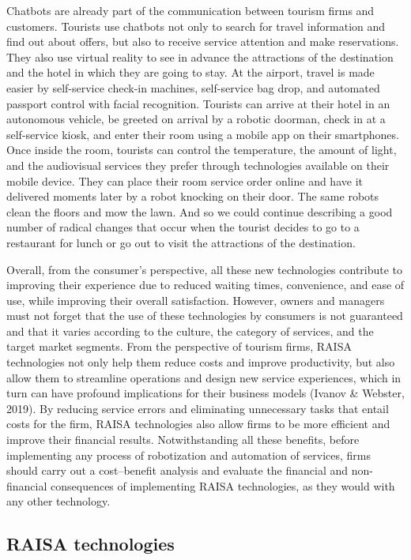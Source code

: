 \documentclass[
  letterpaper,
  DIV=11,
  numbers=noendperiod]{scrreprt}
\begin{document}
Chatbots are already part of the communication between tourism firms and
customers. Tourists use chatbots not only to search for travel
information and find out about offers, but also to receive service
attention and make reservations. They also use virtual reality to see in
advance the attractions of the destination and the hotel in which they
are going to stay. At the airport, travel is made easier by self-service
check-in machines, self-service bag drop, and automated passport control
with facial recognition. Tourists can arrive at their hotel in an
autonomous vehicle, be greeted on arrival by a robotic doorman, check in
at a self-service kiosk, and enter their room using a mobile app on
their smartphones. Once inside the room, tourists can control the
temperature, the amount of light, and the audiovisual services they
prefer through technologies available on their mobile device. They can
place their room service order online and have it delivered moments
later by a robot knocking on their door. The same robots clean the
floors and mow the lawn. And so we could continue describing a good
number of radical changes that occur when the tourist decides to go to a
restaurant for lunch or go out to visit the attractions of the
destination.

Overall, from the consumer's perspective, all these new technologies
contribute to improving their experience due to reduced waiting times,
convenience, and ease of use, while improving their overall
satisfaction. However, owners and managers must not forget that the use
of these technologies by consumers is not guaranteed and that it varies
according to the culture, the category of services, and the target
market segments. From the perspective of tourism firms, RAISA
technologies not only help them reduce costs and improve productivity,
but also allow them to streamline operations and design new service
experiences, which in turn can have profound implications for their
business models (Ivanov \& Webster, 2019). By reducing service errors
and eliminating unnecessary tasks that entail costs for the firm, RAISA
technologies also allow firms to be more efficient and improve their
financial results. Notwithstanding all these benefits, before
implementing any process of robotization and automation of services,
firms should carry out a cost--benefit analysis and evaluate the
financial and non-financial consequences of implementing RAISA
technologies, as they would with any other technology.

\hypertarget{raisa-technologies-1}{%
\subsection{RAISA technologies}\label{raisa-technologies-1}}
\end{document}
